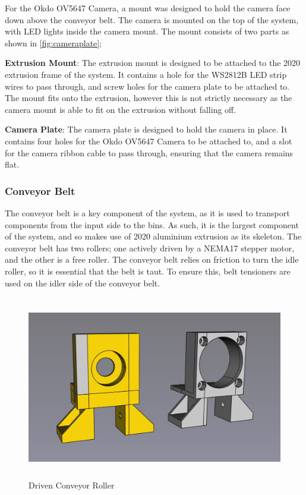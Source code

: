 For the Okdo OV5647 Camera, a mount was designed to hold the camera face down above the conveyor belt. The camera is mounted on the top of the system, with LED lights inside the camera mount. The mount consists of two parts as shown in \autoref{fig:cameraplate};
\par
\textbf{Extrusion Mount}: The extrusion mount is designed to be attached to the 2020 extrusion frame of the system. It contains a hole for the WS2812B LED strip wires to pass through, and screw holes for the camera plate to be attached to. The mount fits onto the extrusion, however this is not strictly necessary as the camera mount is able to fit on the extrusion without falling off.
\par
\textbf{Camera Plate}: The camera plate is designed to hold the camera in place. It contains four holes for the Okdo OV5647 Camera to be attached to, and a slot for the camera ribbon cable to pass through, ensuring that the camera remains flat.
\subsubsection{Conveyor Belt}
\label{sec:conveyor-belt}
The conveyor belt is a key component of the system, as it is used to transport components from the input side to the bins. As such, it is the largest component of the system, and so makes use of 2020 aluminium extrusion as its skeleton. The conveyor belt has two rollers; one actively driven by a NEMA17 stepper motor, and the other is a free roller. The conveyor belt relies on friction to turn the idle roller, so it is essential that the belt is taut. To ensure this, belt tensioners are used on the idler side of the conveyor belt.

\begin{figure}[H]
    \begin{minipage}[h]{0.95\textwidth}
        \centering
        \includegraphics[height=8cm]{imgs/freecad/conveyor_driven.jpg}
        \caption{Driven Conveyor Roller}
        \label{fig:conveyordriven}
    \end{minipage}
\end{figure}

